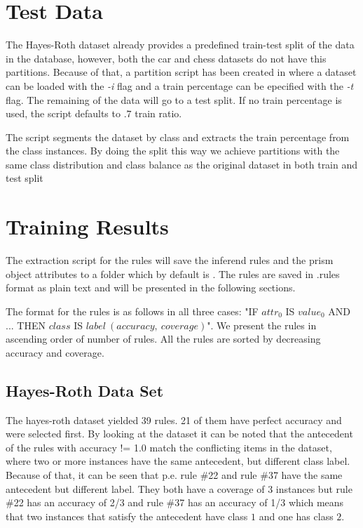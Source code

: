 \section{Test Data}

The Hayes-Roth dataset already provides a predefined train-test split of the data in the database, however, both the car and chess datasets do not have this partitions. Because of that, a partition script has been created in  where a dataset can be loaded with the \emph{-i} flag and a train percentage can be epecified with the \emph{-t} flag. The remaining of the data will go to a test split. If no train percentage is used, the script defaults to $.7$ train ratio.\;

The script segments the dataset by class and extracts the train percentage from the class instances. By doing the split this way we achieve partitions with the same class distribution and class balance as the original dataset in both train and test split

\section{Training Results}

The extraction script for the rules will save the inferend rules and the prism object attributes to a folder which by default is . The rules are saved in .rules format as plain text and will be presented in the following sections.

The format for the rules is as follows in all three cases: "IF $attr_0$ IS $value_0$ AND ... THEN $class$ IS $label\ (accuracy,\ coverage)$". We present the rules in ascending order of number of rules. All the rules are sorted by decreasing accuracy and coverage.

\subsection{Hayes-Roth Data Set}

The hayes-roth dataset yielded 39 rules. 21 of them have perfect accuracy and were selected first. By looking at the dataset it can be noted that the antecedent of the rules with accuracy != 1.0 match the conflicting items in the dataset, where two or more instances have the same antecedent, but different class label. Because of that, it can be seen that p.e. rule \#22 and rule \#37 have the same antecedent but different label. They both have a coverage of 3 instances but rule \#22 has an accuracy of 2/3 and rule \#37 has an accuracy of 1/3 which means that two instances that satisfy the antecedent have class $1$ and one has class $2$.\;

